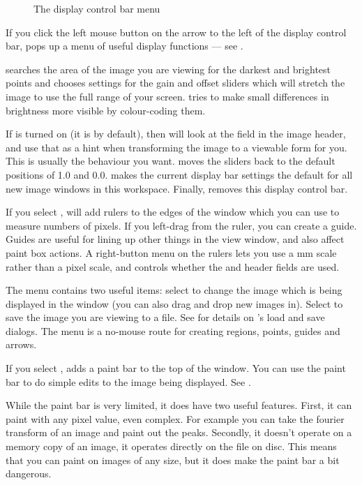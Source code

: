 \begin{figure}
\caption{The display control bar menu}
\end{figure}

If you click the left mouse button on the arrow to the left of the display 
control bar, \nip{} pops up a menu of useful display functions ---
see .

 searches the area of the image you are viewing for the darkest
and brightest points and chooses settings for the gain and offset sliders
which will stretch the image to use the full range of your screen.  tries to make small differences in brightness more visible by
colour-coding them.

If  is turned on (it is by default), then \nip{} will look
at the  field in the image header, and use that as a hint when
transforming the image to a viewable form for you. This is usually the
behaviour you want.   moves the sliders back to the default
positions of 1.0 and 0.0.  makes the current
display bar settings the default for all new image windows in this workspace.
Finally,  removes this display control
bar.

If you select , \nip{} will add rulers to the
edges of the window which you can use to measure numbers of pixels.
If you left-drag from the ruler, you can create a guide.
Guides are useful for lining up other things in the view window, and also
affect paint box actions. A right-button menu on the rulers lets you use a mm
scale rather than a pixel scale, and controls whether the  and
 header fields are used.

The  menu contains two useful items: select  to change the image which is being displayed in the window (you can
also drag and drop new images in). Select
 to save the image you are viewing to a file. See
 for details on \nip{}'s load and save dialogs. The
 menu is a no-mouse route for creating regions, points, guides
and arrows.

If you select , \nip{} adds a paint bar
to the top of the window. You can use the paint bar to do simple edits to
the image being displayed. See .

While the paint bar is very limited, it does have two useful features. First,
it can paint with any pixel value, even complex. For example you can take the
fourier transform of an image and paint out the peaks. Secondly, it doesn't
operate on a memory copy of an image, it operates directly on the file on
disc. This means that you can paint on images of any size, but it does make
the paint bar a bit dangerous.

